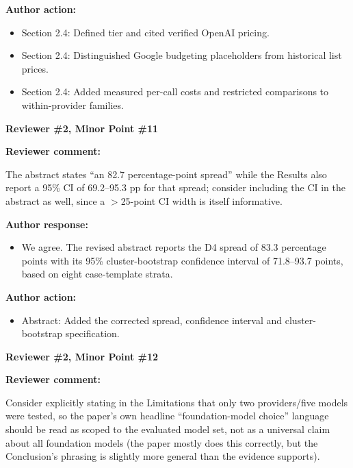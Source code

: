 \documentclass[11pt]{article}
\newcommand{\rvcomment}[1]{{\color{ReviewerGreen}#1}}
\newcommand{\concern}[1]{\textbf{\color{ReviewerGreen}#1}}
\begin{document}
\textbf{Author action:}

\begin{itemize}

\item Section 2.4: Defined tier and cited verified OpenAI pricing.

\item Section 2.4: Distinguished Google budgeting placeholders from historical list prices.

\item Section 2.4: Added measured per-call costs and restricted comparisons to within-provider families.

\end{itemize}

\vspace{12pt}
\concern{Reviewer \#2, Minor Point \#11}

\concern{Reviewer comment:}

\rvcomment{The abstract states ``an 82.7 percentage-point spread'' while the Results also report a 95\% CI of 69.2--95.3 pp for that spread; consider including the CI in the abstract as well, since a $>$25-point CI width is itself informative.}

\textbf{Author response:}

\begin{itemize}

\item We agree. The revised abstract reports the D4 spread of 83.3 percentage points with its 95\% cluster-bootstrap confidence interval of 71.8--93.7 points, based on eight case-template strata.

\end{itemize}

\textbf{Author action:}

\begin{itemize}

\item Abstract: Added the corrected spread, confidence interval and cluster-bootstrap specification.

\end{itemize}

\vspace{12pt}
\concern{Reviewer \#2, Minor Point \#12}

\concern{Reviewer comment:}

\rvcomment{Consider explicitly stating in the Limitations that only two providers/five models were tested, so the paper's own headline ``foundation-model choice'' language should be read as scoped to the evaluated model set, not as a universal claim about all foundation models (the paper mostly does this correctly, but the Conclusion's phrasing is slightly more general than the evidence supports).}
\end{document}

